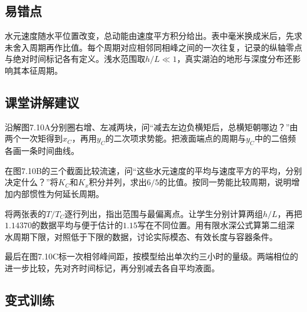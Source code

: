 \documentclass[UTF8,fontset=fandol,a4paper,11pt]{ctexart}
\begin{document}


\subsection*{易错点}

水元速度随水平位置改变，总动能由速度平方积分给出。表中毫米换成米后，先求未舍入周期再作比值。每个周期对应相邻同相峰之间的一次往复，记录的纵轴零点与绝对时间标记各有定义。浅水范围取$h/L\ll1$，真实湖泊的地形与深度分布还影响其本征周期。




\subsection*{课堂讲解建议}

沿解图7.10A分别圈右增、左减两块，问“减去左边负横矩后，总横矩朝哪边？”由两个一次矩得到$x_C$，再用$y_C$的二次项求势能。把液面端点的周期与$y_C$中的二倍频各画一条时间曲线。

在图7.10B的三个截面比较流速，问“这些水元速度的平均与速度平方的平均，分别决定什么？”将$K_C$和$K_x$积分并列，求出$6/5$的比值。按同一势能比较周期，说明增加内部惯性为何延长周期。

将两张表的$T/T_C$逐行列出，指出范围与最偏离点。让学生分别计算两组$h/L$，再把$1.14370$的数据平均与便于估计的$1.15$写在不同位置。用有限水深公式算第二组深水周期下限，对照低于下限的数据，讨论实际模态、有效长度与容器条件。

最后在图7.10C标一次相邻峰间距，按模型给出单次约三小时的量级。两端相位的进一步比较，先对齐时间标记，再分别减去各自平均液面。




\subsection*{变式训练}
\end{document}
